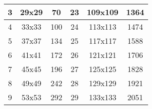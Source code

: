 \begin{appendix}
\begin{table}[htbp]
\begin{tabular}{|c|c|c|c|c|c|}
			3                & 29x29                                                            & 70                                                                           & 23               & 109x109                                                          & 1364                                                                          \\ \hline
			4                & 33x33                                                            & 100                                                                          & 24               & 113x113                                                          & 1474                                                                          \\ \hline
			5                & 37x37                                                            & 134                                                                          & 25               & 117x117                                                          & 1588                                                                          \\ \hline
			6                & 41x41                                                            & 172                                                                          & 26               & 121x121                                                          & 1706                                                                          \\ \hline
			7                & 45x45                                                            & 196                                                                          & 27               & 125x125                                                          & 1828                                                                          \\ \hline
			8                & 49x49                                                            & 242                                                                          & 28               & 129x129                                                          & 1921                                                                          \\ \hline
			9                & 53x53                                                            & 292                                                                          & 29               & 133x133                                                          & 2051                                                                          \\ \hline

\end{tabular}
\end{table}
\end{appendix}
